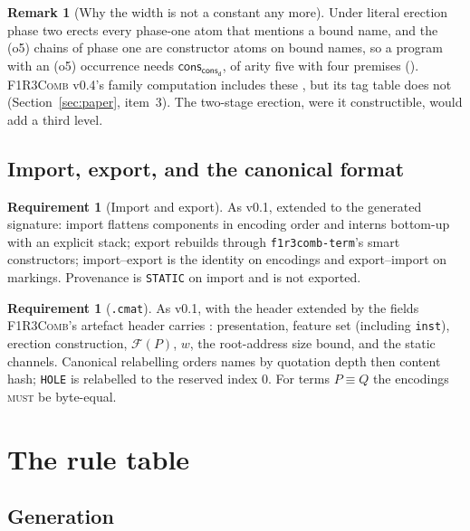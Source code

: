 \documentclass[11pt,a4paper]{article}
\newcommand{\code}[1]{\texttt{#1}}
\newcommand{\Comb}{\textsc{F1R3Comb}}
\newcommand{\MUST}{\textsc{must}}
\newcommand{\scong}{\equiv}
\newcommand{\dd}{\mathsf{d}}
\newcommand{\cons}{\mathsf{cons}}
\theoremstyle{definition}
\newtheorem{requirement}[definition]{Requirement}
\newtheorem{remark}[definition]{Remark}
\theoremstyle{plain}
\newcommand{\Fam}{\mathcal{F}}
\begin{document}
\begin{remark}[Why the width is not a constant any more]
Under literal erection phase two erects every phase-one atom that mentions a
bound name, and the (o5) chains of phase one are constructor atoms on bound
names, so a program with an (o5) occurrence needs $\cons_{\cons_{\dd}}$, of
arity five with four premises (\cite[\S14.1]{matnote}). \Comb{} v0.4's
family computation includes these \cite[Req.~4.7]{combspec}, but its tag
table does not (Section~\ref{sec:paper}, item~3). The two-stage erection, were
it constructible, would add a third level.
\end{remark}

\subsection{Import, export, and the canonical format}

\begin{requirement}[Import and export]\label{req:import}
As v0.1, extended to the generated signature: import flattens components in
encoding order and interns bottom-up with an explicit stack; export rebuilds
through \code{f1r3comb-term}'s smart constructors; import--export is the
identity on encodings and export--import on markings. Provenance is
\code{STATIC} on import and is not exported.
\end{requirement}

\begin{requirement}[\code{.cmat}]\label{req:cmat}
As v0.1, with the header extended by the fields \Comb's artefact header
carries \cite[\S8.1]{combspec}: presentation, feature set (including
\code{inst}), erection construction, $\Fam(P)$, $w$, the root-address size
bound, and the static channels. Canonical relabelling orders names by
quotation depth then content hash; \code{HOLE} is relabelled to the reserved
index $0$. For terms $P \scong Q$ the encodings \MUST{} be byte-equal.
\end{requirement}

\section{The rule table}\label{sec:rules}

\subsection{Generation}
\end{document}
